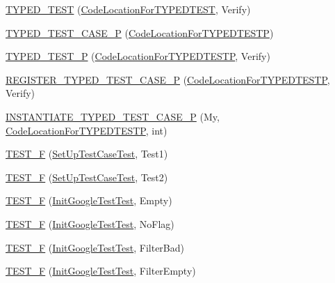 \begin{DoxyCompactItemize}
\hyperlink{namespacetesting_a400c572f732b06e836d6b3a5adfc4cf7}{T\+Y\+P\+E\+D\+\_\+\+T\+E\+ST} (\hyperlink{classtesting_1_1CodeLocationForTYPEDTEST}{Code\+Location\+For\+T\+Y\+P\+E\+D\+T\+E\+ST}, Verify)
\item 
\hyperlink{namespacetesting_a439eefbc85668f74fd9e0c2cb7c7d0b0}{T\+Y\+P\+E\+D\+\_\+\+T\+E\+S\+T\+\_\+\+C\+A\+S\+E\+\_\+P} (\hyperlink{classtesting_1_1CodeLocationForTYPEDTESTP}{Code\+Location\+For\+T\+Y\+P\+E\+D\+T\+E\+S\+TP})
\item 
\hyperlink{namespacetesting_a3f3fbbc7ecc23117307b81deb8f4cfac}{T\+Y\+P\+E\+D\+\_\+\+T\+E\+S\+T\+\_\+P} (\hyperlink{classtesting_1_1CodeLocationForTYPEDTESTP}{Code\+Location\+For\+T\+Y\+P\+E\+D\+T\+E\+S\+TP}, Verify)
\item 
\hyperlink{namespacetesting_a9fc96ebb1c0e7db169c4a5697c903f56}{R\+E\+G\+I\+S\+T\+E\+R\+\_\+\+T\+Y\+P\+E\+D\+\_\+\+T\+E\+S\+T\+\_\+\+C\+A\+S\+E\+\_\+P} (\hyperlink{classtesting_1_1CodeLocationForTYPEDTESTP}{Code\+Location\+For\+T\+Y\+P\+E\+D\+T\+E\+S\+TP}, Verify)
\item 
\hyperlink{namespacetesting_a111c1dea1140652727ab97ddc13eb045}{I\+N\+S\+T\+A\+N\+T\+I\+A\+T\+E\+\_\+\+T\+Y\+P\+E\+D\+\_\+\+T\+E\+S\+T\+\_\+\+C\+A\+S\+E\+\_\+P} (My, \hyperlink{classtesting_1_1CodeLocationForTYPEDTESTP}{Code\+Location\+For\+T\+Y\+P\+E\+D\+T\+E\+S\+TP}, int)
\item 
\hyperlink{namespacetesting_a01e948eb5427d31f70eafaf472e2bfa8}{T\+E\+S\+T\+\_\+F} (\hyperlink{classtesting_1_1SetUpTestCaseTest}{Set\+Up\+Test\+Case\+Test}, Test1)
\item 
\hyperlink{namespacetesting_a8fc2e448ce96e4da357a2129d49e86e3}{T\+E\+S\+T\+\_\+F} (\hyperlink{classtesting_1_1SetUpTestCaseTest}{Set\+Up\+Test\+Case\+Test}, Test2)
\item 
\hyperlink{namespacetesting_ae80ccfaa178730f49af649cd044e84e4}{T\+E\+S\+T\+\_\+F} (\hyperlink{classtesting_1_1InitGoogleTestTest}{Init\+Google\+Test\+Test}, Empty)
\item 
\hyperlink{namespacetesting_add96563b5ca11c20fe2766a848c2bb63}{T\+E\+S\+T\+\_\+F} (\hyperlink{classtesting_1_1InitGoogleTestTest}{Init\+Google\+Test\+Test}, No\+Flag)
\item 
\hyperlink{namespacetesting_ab368a135e5a7a59bceb912a5f636004a}{T\+E\+S\+T\+\_\+F} (\hyperlink{classtesting_1_1InitGoogleTestTest}{Init\+Google\+Test\+Test}, Filter\+Bad)
\item 
\hyperlink{namespacetesting_a04d011d2e5695513c45216ae1b98095b}{T\+E\+S\+T\+\_\+F} (\hyperlink{classtesting_1_1InitGoogleTestTest}{Init\+Google\+Test\+Test}, Filter\+Empty)

\end{DoxyCompactItemize}
